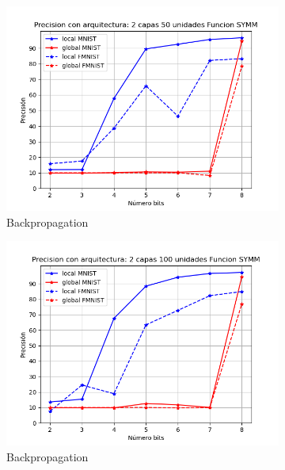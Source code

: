 \begin{figure}[H]
    \centering
    \begin{subfigure}[H]{0.475\textwidth}
    \includegraphics[width=\textwidth]{imagenes/backprop/Precision con arquitectura: 2 capas 50 unidades Funcion SYMM.png}
    \caption{Backpropagation}
    \end{subfigure}
    \begin{subfigure}[H]{0.475\textwidth}
    \includegraphics[width=\textwidth]{imagenes/backprop/Precision con arquitectura: 2 capas 100 unidades Funcion SYMM.png}
    \caption{Backpropagation}
    \end{subfigure}
    \begin{subfigure}[H]{0.475\textwidth}

\end{subfigure}
\end{figure}
